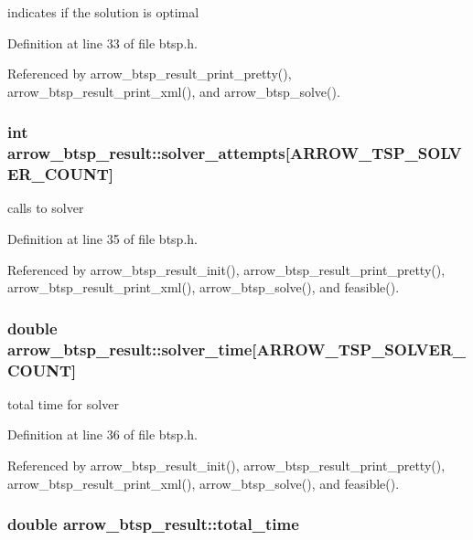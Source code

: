 indicates if the solution is optimal 

Definition at line 33 of file btsp.h.

Referenced by arrow\_\-btsp\_\-result\_\-print\_\-pretty(), arrow\_\-btsp\_\-result\_\-print\_\-xml(), and arrow\_\-btsp\_\-solve().\hypertarget{structarrow__btsp__result_b1d423ab6eda81de4c3bde1685976593}{
\subsubsection[{solver\_\-attempts}]{\setlength{\rightskip}{0pt plus 5cm}int {\bf arrow\_\-btsp\_\-result::solver\_\-attempts}\mbox{[}ARROW\_\-TSP\_\-SOLVER\_\-COUNT\mbox{]}}}
\label{structarrow__btsp__result_b1d423ab6eda81de4c3bde1685976593}


calls to solver 

Definition at line 35 of file btsp.h.

Referenced by arrow\_\-btsp\_\-result\_\-init(), arrow\_\-btsp\_\-result\_\-print\_\-pretty(), arrow\_\-btsp\_\-result\_\-print\_\-xml(), arrow\_\-btsp\_\-solve(), and feasible().\hypertarget{structarrow__btsp__result_f13227603570821a0ba7d6466f39f00c}{
\subsubsection[{solver\_\-time}]{\setlength{\rightskip}{0pt plus 5cm}double {\bf arrow\_\-btsp\_\-result::solver\_\-time}\mbox{[}ARROW\_\-TSP\_\-SOLVER\_\-COUNT\mbox{]}}}
\label{structarrow__btsp__result_f13227603570821a0ba7d6466f39f00c}


total time for solver 

Definition at line 36 of file btsp.h.

Referenced by arrow\_\-btsp\_\-result\_\-init(), arrow\_\-btsp\_\-result\_\-print\_\-pretty(), arrow\_\-btsp\_\-result\_\-print\_\-xml(), arrow\_\-btsp\_\-solve(), and feasible().\hypertarget{structarrow__btsp__result_dea5711f0a574d98f66d1b20011a68de}{
\subsubsection[{total\_\-time}]{\setlength{\rightskip}{0pt plus 5cm}double {\bf arrow\_\-btsp\_\-result::total\_\-time}}}
\label{structarrow__btsp__result_dea5711f0a574d98f66d1b20011a68de}


